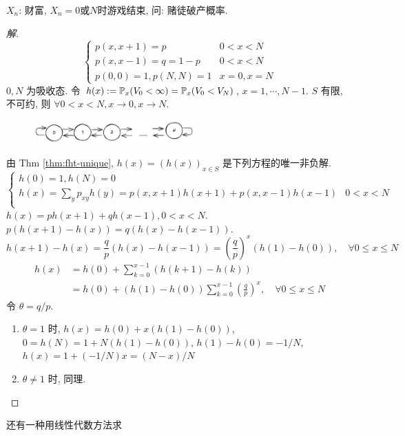 \begin{example}\label{exa:1.43}
    $X_n$: 财富, $X_n=0$或$N$时游戏结束, 问: 赌徒破产概率.
\end{example}
\begin{proof}[解]
    \[
    \begin{cases}
        p(x,x+1)=p & 0<x<N\\
        p(x,x-1)=q=1-p & 0<x<N\\
        p(0,0)=1,p(N,N)=1 & x=0,x=N
    \end{cases}
    \]
    $0,N$ 为吸收态. 令 $h(x):=\mathbb{P}_x(V_0<\infty)=\mathbb{P}_x(V_0<V_N)$, $x=1,\cdots,N-1$. $S$ 有限, 不可约, 则 $\forall 0<x<N, x\to 0, x\to N$.
    \begin{figure}[H]
        \centering
        \includegraphics[width=0.55\textwidth]{figures/exa_p79.png}
    \end{figure}
    由 Thm \ref{thm:fht-unique}, $h(x)=(h(x))_{x\in S}$ 是下列方程的唯一非负解.
    \[
    \begin{cases}
        h(0)=1, h(N)=0\\
        h(x)=\sum_y p_{xy}h(y)=p(x,x+1)h(x+1)+p(x,x-1)h(x-1) & 0<x<N\\
    \end{cases}
    \]
    $h(x)=ph(x+1)+qh(x-1), 0<x<N$. $p(h(x+1)-h(x))=q(h(x)-h(x-1))$.
    \[
    h(x+1)-h(x)=\frac{q}{p}(h(x)-h(x-1))=\left(\frac{q}{p}\right)^x(h(1)-h(0)),\quad \forall 0\leq x\leq N
    \]
    \[
    \begin{aligned}
    h(x) &=h(0)+\sum_{k=0}^{x-1}(h(k+1)-h(k))\\
    &=h(0)+(h(1)-h(0))\sum_{k=0}^{x-1}\left(\frac{q}{p}\right)^x,\quad \forall 0\leq x\leq N
    \end{aligned}
    \]
    令 $\theta=q/p$.
\begin{enumerate}
    \item $\theta=1$ 时, $h(x)=h(0)+x(h(1)-h(0))$, $0=h(N)=1+N(h(1)-h(0))$, $h(1)-h(0)=-1/N$, $h(x)=1+(-1/N)x=(N-x)/N$
    \item $\theta\neq 1$ 时, 同理.
\end{enumerate}
\end{proof}
还有一种用线性代数方法求


